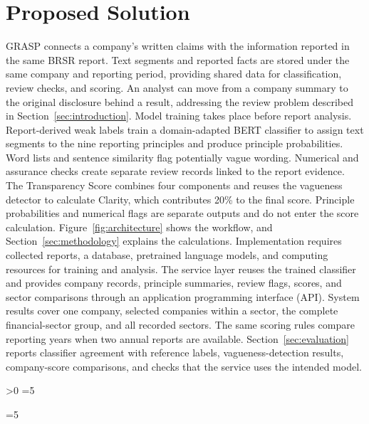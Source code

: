 \section{Proposed Solution}
\label{sec:proposed}

GRASP connects a company's written claims with the information reported in the same BRSR report. Text segments and reported facts are stored under the same company and reporting period, providing shared data for classification, review checks, and scoring. An analyst can move from a company summary to the original disclosure behind a result, addressing the review problem described in Section~\ref{sec:introduction}. Model training takes place before report analysis. Report-derived weak labels train a domain-adapted BERT classifier to assign text segments to the nine reporting principles and produce principle probabilities. Word lists and sentence similarity flag potentially vague wording. Numerical and assurance checks create separate review records linked to the report evidence. The Transparency Score combines four components and reuses the vagueness detector to calculate Clarity, which contributes 20\% to the final score. Principle probabilities and numerical flags are separate outputs and do not enter the score calculation. Figure~\ref{fig:architecture} shows the workflow, and Section~\ref{sec:methodology} explains the calculations. Implementation requires collected reports, a database, pretrained language models, and computing resources for training and analysis. The service layer reuses the trained classifier and provides company records, principle summaries, review flags, scores, and sector comparisons through an application programming interface (API). System results cover one company, selected companies within a sector, the complete financial-sector group, and all recorded sectors. The same scoring rules compare reporting years when two annual reports are available. Section~\ref{sec:evaluation} reports classifier agreement with reference labels, vagueness-detection results, company-score comparisons, and checks that the service uses the intended model.\label{sec:proposed-end}\par

\ifnum{}>0\relax
  \ifnum{}=5\relax\else
    \PackageError{GRASP-layout}{Proposed Solution starts on page \getpagerefnumber{sec:proposed}, expected 5}{Keep the section together on page 5.}
  \fi
  \ifnum{}=5\relax\else
    \PackageError{GRASP-layout}{Proposed Solution ends on page \getpagerefnumber{sec:proposed-end}, expected 5}{Shorten repeated wording while retaining the technical content.}
  \fi
\fi
